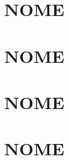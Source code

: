 \documentclass[12pt, a4paper]{article}
\begin{document}
\newpage

\section*{NOME}


\newpage

\section*{NOME}


\newpage

\section*{NOME}


\newpage

\section*{NOME}
\end{document}
